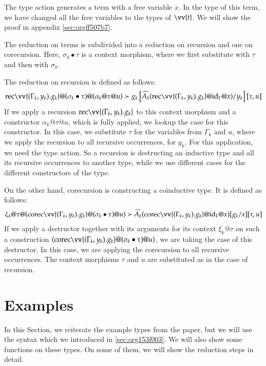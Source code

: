 \documentclass[a4paper,cleardoubleempty,BCOR1cm]{scrbook}
\begin{document}
The type action generates a term with a free variable \(x\).  In the type of
this term, we have changed all the free variables to the types of \(\vv{t}\).
We will show the proof in appendix \ref{sec:orgff507b7}.

The reduction on terms  is subdivided into a reduction on recursion and one
on corecursion. Here, \(\sigma_k \bullet\tau\) is a context morphism, where we
first substitute with \(\tau\) and then with \(\sigma_k\).

The reduction on recursion is defined as follows:
\begin{align*}
  \rec \vv{(\Gamma_k,y_k).g_k}@(\sigma_k\bullet\tau)@(\alpha_k@\tau@u)\succ g_k\left[ \widehat{A_k}(\rec\vv{(\Gamma_k,y_k).g_k}@\id{\Gamma}@x)/y_k \right][\tau,u]\\
\end{align*}
If we apply a recursion \(\rec \vv{(\Gamma_k,y_k).g_k}\) to this context
morphism and a constructor \(\alpha_k@\tau@u\), which is fully applied, we
lookup the case for this constructor. In this case, we substitute \(\tau\) for
the variables from \(\Gamma_k\) and \(u\), where we apply the recursion to all
recursive occurrences, for \(y_k\). For this application, we need the type
action. So a recursion is destructing an inductive type and all its recursive
occurrences to another type, while we use different cases for the different
constructors of the type.

On the other hand, corecursion is constructing a coinductive type. It is defined
as follows:
\begin{align*}
  \xi_k@\tau@(\corec \vv{(\Gamma_k,y_k).g_k}@(\sigma_k\bullet\tau)@u)\succ \widehat{A_k}(\corec\vv{(\Gamma_k,y_k).g_k}@\id{\Gamma}@x)[g_k/x] [\tau,u]
\end{align*}
If we apply a destructor together with its arguments for its context
\(\xi_k@\tau\) on such a construction \((\corec
   \vv{(\Gamma_k,y_k).g_k}@(\sigma_k\bullet\tau)@u)\), we are taking the case of
this destructor. In this case, we are applying the corecursion to all
recursive occurrences. The context morphisms \(\tau\) and \(u\) are substituted
as in the case of recursion.

\chapter{Examples}
\label{sec:orgd840521}

In this Section, we reiterate the example types from the paper, but we will use the
syntax which we introduced in \ref{sec:org153f003}.  We will also show some functions
on these types.  On some of them, we will show the reduction steps in detail.
\end{document}
